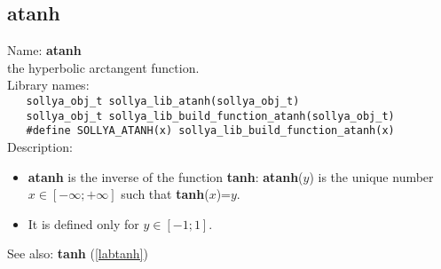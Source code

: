 \subsection{atanh}
\label{labatanh}
\noindent Name: \textbf{atanh}\\
\phantom{aaa}the hyperbolic arctangent function.\\[0.2cm]
\noindent Library names:\\
\verb|   sollya_obj_t sollya_lib_atanh(sollya_obj_t)|\\
\verb|   sollya_obj_t sollya_lib_build_function_atanh(sollya_obj_t)|\\
\verb|   #define SOLLYA_ATANH(x) sollya_lib_build_function_atanh(x)|\\[0.2cm]
\noindent Description: \begin{itemize}

\item \textbf{atanh} is the inverse of the function \textbf{tanh}: \textbf{atanh}($y$) is the unique number 
   $x \in [-\infty; +\infty]$ such that \textbf{tanh}($x$)=$y$.

\item It is defined only for $y \in [-1; 1]$.
\end{itemize}
See also: \textbf{tanh} (\ref{labtanh})
